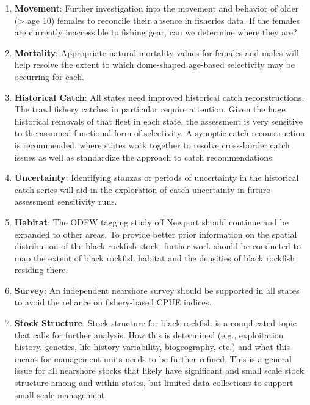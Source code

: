\documentclass[12pt,]{article}
\begin{document}
\begin{enumerate}

\item \textbf{Movement}: Further investigation into the movement and behavior of older (> age 10) females to reconcile their absence in fisheries data. If the females are currently inaccessible to fishing gear, can we determine where they are?

\item \textbf{Mortality}: Appropriate natural mortality values for females and males will help resolve the extent to which dome-shaped age-based selectivity may be occurring for each.

\item \textbf{Historical Catch}:  All states need improved historical catch reconstructions. The trawl fishery catches in particular require attention. Given the huge historical removals of that fleet in each state, the assessment is very sensitive to the assumed functional form of selectivity. A synoptic catch reconstruction is recommended, where states work together to resolve cross-border catch issues as well as standardize the approach to catch recommendations.

\item \textbf{Uncertainty}: Identifying stanzas or periods of uncertainty in the historical catch series will aid in the exploration of catch uncertainty in future assessment sensitivity runs.

\item \textbf{Habitat}: The ODFW tagging study off Newport should continue and be expanded to other areas. To provide better prior information on the spatial distribution of the black rockfish stock, further work should be conducted to map the extent of black rockfish habitat and the densities of black rockfish residing there.

\item \textbf{Survey}:  An independent nearshore survey should be supported in all states to avoid the reliance on fishery-based CPUE indices.

\item \textbf{Stock Structure}:  Stock structure for black rockfish is a complicated topic that calls for further analysis. How this is determined (e.g., exploitation history, genetics, life history variability, biogeography, etc.) and what this means for management units needs to be further refined. This is a general issue for all nearshore stocks that likely have significant and small scale stock structure among and within states, but limited data collections to support small-scale management.

\end{enumerate}
\end{document}
